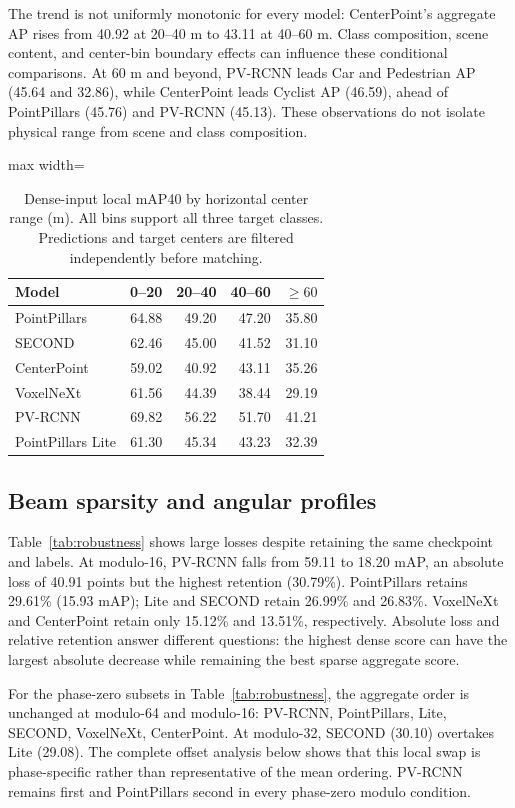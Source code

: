 \documentclass[10pt,twocolumn]{article}
\begin{document}
The trend is not uniformly monotonic for every model: CenterPoint's aggregate AP rises from 40.92 at 20--40 m to 43.11 at 40--60 m. Class composition, scene content, and center-bin boundary effects can influence these conditional comparisons. At 60 m and beyond, PV-RCNN leads Car and Pedestrian AP (45.64 and 32.86), while CenterPoint leads Cyclist AP (46.59), ahead of PointPillars (45.76) and PV-RCNN (45.13). These observations do not isolate physical range from scene and class composition.
\begin{table}[!tbp]
\centering\small
\caption{Dense-input local mAP40 by horizontal center range (m). All bins support all three target classes. Predictions and target centers are filtered independently before matching.}
\label{tab:range}
\begin{adjustbox}{max width=\columnwidth}\begin{tabular}{lrrrr}
\toprule
Model & 0--20 & 20--40 & 40--60 & $\geq60$\\
\midrule
PointPillars & 64.88 & 49.20 & 47.20 & 35.80\\
SECOND & 62.46 & 45.00 & 41.52 & 31.10\\
CenterPoint & 59.02 & 40.92 & 43.11 & 35.26\\
VoxelNeXt & 61.56 & 44.39 & 38.44 & 29.19\\
PV-RCNN & 69.82 & 56.22 & 51.70 & 41.21\\
PointPillars Lite & 61.30 & 45.34 & 43.23 & 32.39\\
\bottomrule
\end{tabular}\end{adjustbox}
\end{table}

\FloatBarrier
\subsection{Beam sparsity and angular profiles}
Table~\ref{tab:robustness} shows large losses despite retaining the same checkpoint and labels. At modulo-16, PV-RCNN falls from 59.11 to 18.20 mAP, an absolute loss of 40.91 points but the highest retention (30.79\%). PointPillars retains 29.61\% (15.93 mAP); Lite and SECOND retain 26.99\% and 26.83\%. VoxelNeXt and CenterPoint retain only 15.12\% and 13.51\%, respectively. Absolute loss and relative retention answer different questions: the highest dense score can have the largest absolute decrease while remaining the best sparse aggregate score.

For the phase-zero subsets in Table~\ref{tab:robustness}, the aggregate order is unchanged at modulo-64 and modulo-16: PV-RCNN, PointPillars, Lite, SECOND, VoxelNeXt, CenterPoint. At modulo-32, SECOND (30.10) overtakes Lite (29.08). The complete offset analysis below shows that this local swap is phase-specific rather than representative of the mean ordering. PV-RCNN remains first and PointPillars second in every phase-zero modulo condition.
\end{document}
